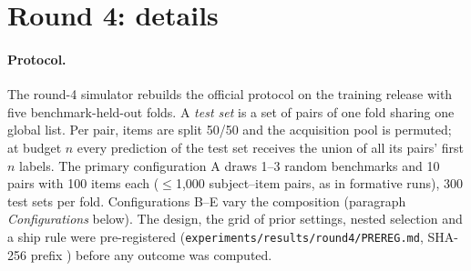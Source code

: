 \documentclass{article}
\begin{document}
\begin{table}[htbp]
\caption{Pre-registered item-difficulty study (\ItModel, $s_1=\log P(\text{Yes})-\log P(\text{No})$): ALC of each variant, its difference to the base (\SelId; INV \ItInvBaseAlc, AS \ItAsBaseAlc) with 95\% cluster-bootstrap CI over benchmarks, and the budget-0 part of that difference. The last row is the Amendment-2 comparison against the intercept-only control. Gate: (a) INV CI below 0 \ItGateBaseA{} against the base and \ItGateCtrlA{} against the control; (b) AS not significantly worse \ItGateBaseB.}
\label{tab:items}
\centering\footnotesize\setlength{\tabcolsep}{3pt}
\end{table}

\section{Round 4: details}
\label{app:round4}

\paragraph{Protocol.} The round-4 simulator rebuilds the official protocol on the training release with five benchmark-held-out folds. A \emph{test set} is a set of pairs of one fold sharing one global list. Per pair, items are split 50/50 and the acquisition pool is permuted; at budget $n$ every prediction of the test set receives the union of all its pairs' first $n$ labels. The primary configuration A draws 1--3 random benchmarks and 10 pairs with 100 items each ($\le$1,000 subject--item pairs, as in formative runs), 300 test sets per fold. Configurations B--E vary the composition (paragraph \emph{Configurations} below). The design, the grid of \XpGridN{} prior settings, nested selection and a ship rule were pre-registered (\texttt{experiments/results/round4/PREREG.md}, SHA-256 prefix \texttt{\XpPreregSha}) before any outcome was computed.
\end{document}
